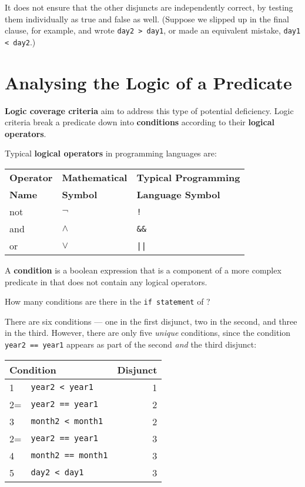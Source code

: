 It does not ensure that the other disjuncts are independently correct, by
testing them individually as true and false as well. (Suppose we slipped up in
the final clause, for example, and wrote {\tt day2 > day1}, or made an
equivalent mistake, {\tt day1 < day2}.)

\section{Analysing the Logic of a Predicate}


{\bf Logic coverage criteria} aim to address this type of potential deficiency.
Logic criteria break a predicate down into {\bf conditions} according to their
{\bf logical operators}.

Typical {\bf logical operators} in programming languages are:

\begin{center}
\begin{tabular}{lll}
    \toprule
    {\bf Operator } & {\bf Mathematical} & {\bf Typical Programming} \\
    {\bf Name     } & {\bf Symbol      } & {\bf Language Symbol    }\\
    \midrule
    not & $\neg$   & {\tt !} \\
    and & $\wedge$ & {\tt \&\&} \\
    or  & $\vee$   & {\tt ||} \\
    \bottomrule
\end{tabular}
\end{center}

A {\bf condition} is a boolean expression that is a component of a more complex
predicate in that does not contain any logical operators.


How many conditions are there in the {\tt if statement} of
\daysbetweentwodatesmethod? 


There are six conditions --- one in the first disjunct, two in the second, and
three in the third. However, there are only five {\it unique} conditions, since
the condition {\tt year2 == year1} appears as part of the second {\it and} the
third disjunct:

\begin{center}
\begin{tabular}{llr}
    \toprule
    \multicolumn{2}{l}{\bf Condition}  & {\bf Disjunct} \\
    \midrule
    1  & {\tt year2 < year1}   & 1 \\
    2= & {\tt year2 == year1}  & 2 \\
    3  & {\tt month2 < month1} & 2 \\
    2= & {\tt year2 == year1}  & 3 \\
    4  & {\tt month2 == month1} & 3 \\
    5  & {\tt day2 < day1}      & 3 \\
    \bottomrule
\end{tabular}
\end{center}

